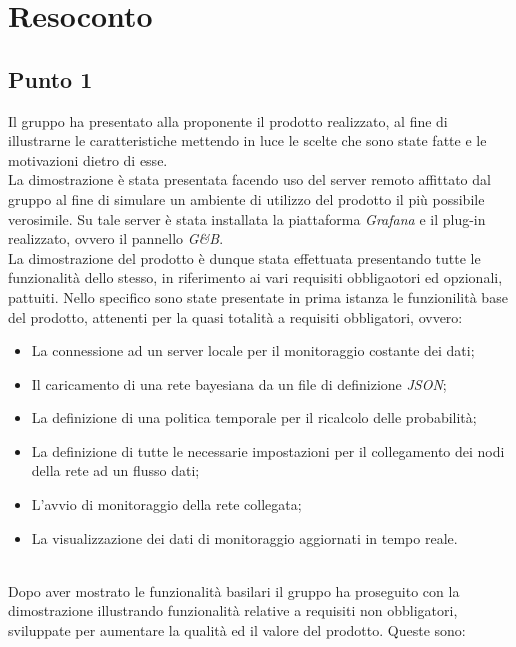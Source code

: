 \section{Resoconto}


\subsection{Punto 1}
Il gruppo ha presentato alla proponente il prodotto realizzato, al fine di illustrarne le caratteristiche mettendo in luce le scelte che sono state fatte e le motivazioni dietro di esse.\\
La dimostrazione è stata presentata facendo uso del server remoto affittato dal gruppo al fine di simulare un ambiente di utilizzo del prodotto il più possibile verosimile. Su tale server è stata installata la piattaforma \textit{Grafana} e il plug-in realizzato, ovvero il pannello \textit{G\&B}.\\
La dimostrazione del prodotto è dunque stata effettuata presentando tutte le funzionalità dello stesso, in riferimento ai vari requisiti obbligaotori ed opzionali, pattuiti. Nello specifico sono state presentate in prima istanza le funzionilità base del prodotto, attenenti per la quasi totalità a requisiti obbligatori, ovvero: 
\begin{itemize}
 \item La connessione ad un server locale per il monitoraggio costante dei dati;
 \item Il caricamento di una rete bayesiana da un file di definizione \textit{JSON};
 \item La definizione di una politica temporale per il ricalcolo delle probabilità;
 \item La definizione di tutte le necessarie impostazioni per il collegamento dei nodi della rete ad un flusso dati;
 \item L'avvio di monitoraggio della rete collegata;
 \item La visualizzazione dei dati di monitoraggio aggiornati in tempo reale.
\end{itemize}
~\\
Dopo aver mostrato le funzionalità basilari il gruppo ha proseguito con la dimostrazione illustrando funzionalità relative a requisiti non obbligatori, sviluppate per aumentare la qualità ed il valore del prodotto. Queste sono:
